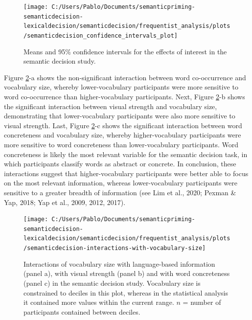 \documentclass[
  12pt,
  man,floatsintext]{apa7}
\begin{document}
\FloatBarrier

\begin{figure}

{\centering \texttt{[image: C:/Users/Pablo/Documents/semanticpriming-semanticdecision-lexicaldecision/semanticdecision/frequentist\_analysis/plots/semanticdecision\_confidence\_intervals\_plot]} 

}

\caption{Means and 95\% confidence intervals for the effects of interest in the semantic decision study.}\label{fig:semanticdecision-confidence-intervals-plot}
\end{figure}

Figure \ref{fig:semanticdecision-interactions-with-vocabulary-size}-a shows the non-significant interaction between word co-occurrence and vocabulary size, whereby lower-vocabulary participants were more sensitive to word co-occurrence than higher-vocabulary participants. Next, Figure \ref{fig:semanticdecision-interactions-with-vocabulary-size}-b shows the significant interaction between visual strength and vocabulary size, demonstrating that lower-vocabulary participants were also more sensitive to visual strength. Last, Figure \ref{fig:semanticdecision-interactions-with-vocabulary-size}-c shows the significant interaction between word concreteness and vocabulary size, whereby higher-vocabulary participants were more sensitive to word concreteness than lower-vocabulary participants. Word concreteness is likely the most relevant variable for the semantic decision task, in which participants classify words as abstract or concrete. In conclusion, these interactions suggest that higher-vocabulary participants were better able to focus on the most relevant information, whereas lower-vocabulary participants were
sensitive to a greater breadth of information (see Lim et al., 2020; Pexman \& Yap, 2018; Yap et al., 2009, 2012, 2017).



\begin{figure}

{\centering \texttt{[image: C:/Users/Pablo/Documents/semanticpriming-semanticdecision-lexicaldecision/semanticdecision/frequentist\_analysis/plots/semanticdecision-interactions-with-vocabulary-size]} 

}

\caption{Interactions of vocabulary size with language-based information (panel a), with visual strength (panel b) and with word concreteness (panel c) in the semantic decision study. Vocabulary size is constrained to deciles in this plot, whereas in the statistical analysis it contained more values within the current range. \(n\) = number of participants contained between deciles.}\label{fig:semanticdecision-interactions-with-vocabulary-size}
\end{figure}
\end{document}
